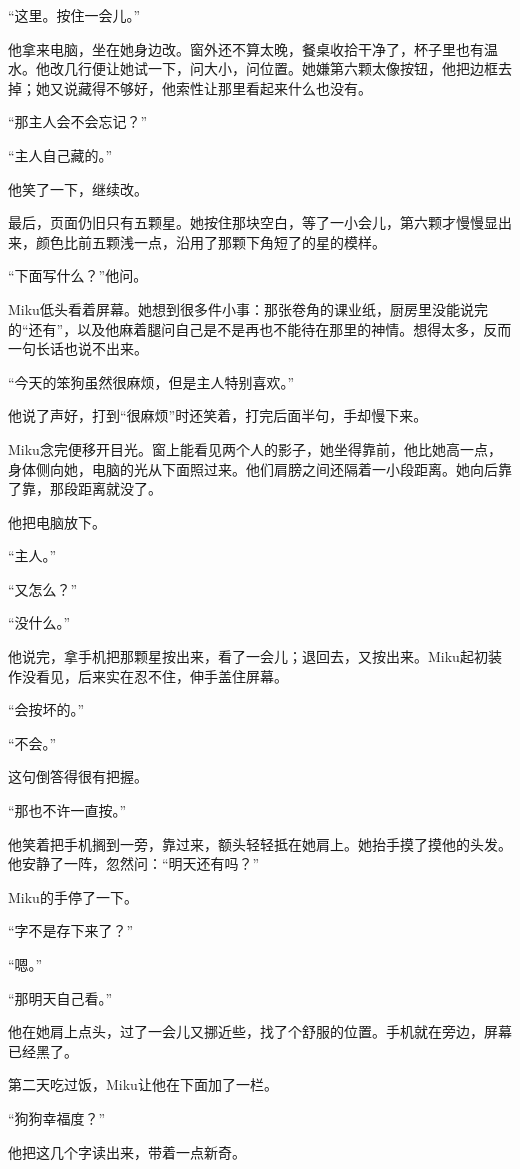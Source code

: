 “这里。按住一会儿。”

他拿来电脑，坐在她身边改。窗外还不算太晚，餐桌收拾干净了，杯子里也有温水。他改几行便让她试一下，问大小，问位置。她嫌第六颗太像按钮，他把边框去掉；她又说藏得不够好，他索性让那里看起来什么也没有。

“那主人会不会忘记？”

“主人自己藏的。”

他笑了一下，继续改。

最后，页面仍旧只有五颗星。她按住那块空白，等了一小会儿，第六颗才慢慢显出来，颜色比前五颗浅一点，沿用了那颗下角短了的星的模样。

“下面写什么？”他问。

Miku低头看着屏幕。她想到很多件小事：那张卷角的课业纸，厨房里没能说完的“还有”，以及他麻着腿问自己是不是再也不能待在那里的神情。想得太多，反而一句长话也说不出来。

“今天的笨狗虽然很麻烦，但是主人特别喜欢。”

他说了声好，打到“很麻烦”时还笑着，打完后面半句，手却慢下来。

Miku念完便移开目光。窗上能看见两个人的影子，她坐得靠前，他比她高一点，身体侧向她，电脑的光从下面照过来。他们肩膀之间还隔着一小段距离。她向后靠了靠，那段距离就没了。

他把电脑放下。

“主人。”

“又怎么？”

“没什么。”

他说完，拿手机把那颗星按出来，看了一会儿；退回去，又按出来。Miku起初装作没看见，后来实在忍不住，伸手盖住屏幕。

“会按坏的。”

“不会。”

这句倒答得很有把握。

“那也不许一直按。”

他笑着把手机搁到一旁，靠过来，额头轻轻抵在她肩上。她抬手摸了摸他的头发。他安静了一阵，忽然问：“明天还有吗？”

Miku的手停了一下。

“字不是存下来了？”

“嗯。”

“那明天自己看。”

他在她肩上点头，过了一会儿又挪近些，找了个舒服的位置。手机就在旁边，屏幕已经黑了。

第二天吃过饭，Miku让他在下面加了一栏。

“狗狗幸福度？”

他把这几个字读出来，带着一点新奇。

